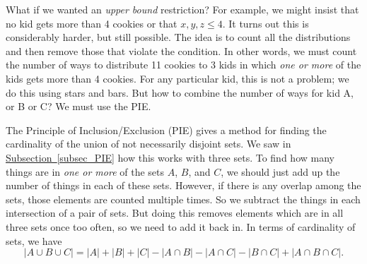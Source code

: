 \documentclass[10pt,]{book}
\theoremstyle{plain}
\theoremstyle{definition}
\theoremstyle{definition}
\theoremstyle{definition}
\numberwithin{equation}{section}
\begin{document}
      What if we wanted an \emph{upper bound} restriction? For example, we might insist that no kid gets more than 4 cookies or that \(x, y, z \le 4\). It turns out this is considerably harder, but still possible. The idea is to count all the distributions and then remove those that violate the condition. In other words, we must count the number of ways to distribute 11 cookies to 3 kids in which \emph{one or more} of the kids gets more than 4 cookies. For any particular kid, this is not a problem; we do this using stars and bars. But how to combine the number of ways for kid A, or B or C? We must use the PIE.
\par

      The Principle of Inclusion/Exclusion (PIE) gives a method for finding the cardinality of the union of not necessarily disjoint sets. We saw in
      \hyperref[subsec_PIE]{Subsection~\ref{subsec_PIE}} how this works with three sets. To find how many things are in \emph{one or more} of the sets \(A\), \(B\), and \(C\), we should just add up the number of things in each of these sets. However, if there is any overlap among the sets, those elements are counted multiple times. So we subtract the things in each intersection of a pair of sets. But doing this removes elements which are in all three sets once too often, so we need to add it back in. In terms of cardinality of sets, we have
      \begin{equation*}
        |A \cup B \cup C| = |A| + |B| + |C| - |A \cap B| - |A \cap C| - |B \cap C| + |A\cap B \cap C|.
      \end{equation*}
\end{document}
